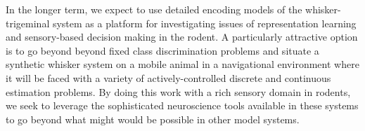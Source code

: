 In the longer term, we expect to use detailed encoding models of the whisker-trigeminal system as a platform for investigating issues of representation learning and sensory-based decision making in the rodent. 
A particularly attractive option is to go beyond beyond fixed class discrimination problems and situate a synthetic whisker system on a mobile animal in a navigational environment where it will be faced with a variety of actively-controlled discrete and continuous estimation problems.
By doing this work with a rich sensory domain in rodents, we seek to leverage the sophisticated neuroscience tools available in these systems to go beyond what might would be possible in other model systems.  

